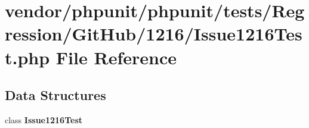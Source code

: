 \section{vendor/phpunit/phpunit/tests/\+Regression/\+Git\+Hub/1216/\+Issue1216\+Test.php File Reference}
\label{_issue1216_test_8php}
\subsection*{Data Structures}
\begin{DoxyCompactItemize}
\item 
class {\bf Issue1216\+Test}
\end{DoxyCompactItemize}
